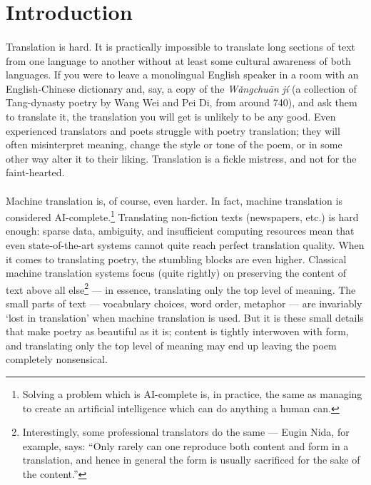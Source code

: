 \section*{Introduction}

\paragraph{}{Translation is hard. It is practically impossible to
  translate long sections of text from one language to another without
  at least some cultural awareness of both languages. If you were to
  leave a monolingual English speaker in a room with an
  English-Chinese dictionary and, say, a copy of the {\it W\v angchu\=
    an j\'i} (a collection of Tang-dynasty poetry by Wang Wei and Pei
  Di, from around 740), and ask them to translate it, the translation
  you will get is unlikely to be any good. Even experienced
  translators and poets struggle with poetry translation; they will
  often misinterpret meaning, change the style or tone of the poem, or
  in some other way alter it to their liking. \cite{wangwei}
  Translation is a fickle mistress, and not for the faint-hearted. }

\paragraph{}{Machine translation is, of course, even harder. In fact,
  machine translation is considered AI-complete.\footnote{Solving a
    problem which is AI-complete is, in practice, the same as managing
    to create an artificial intelligence which can do anything a human
    can.} Translating non-fiction texts (newspapers, etc.) is hard
  enough: sparse data, ambiguity, and insufficient computing resources
  mean that even state-of-the-art systems cannot quite reach perfect
  translation quality. When it comes to translating poetry, the
  stumbling blocks are even higher. Classical machine translation
  systems focus (quite rightly) on preserving the content of text
  above all else\footnote{Interestingly, some professional
    translators do the same --- Eugin Nida, for example, says: ``Only
    rarely can one reproduce both content and form in a translation,
    and hence in general the form is usually sacrificed for the sake
    of the content.''\cite{eugin}} --- in essence, translating only the
  top level of meaning. The small parts of text --- vocabulary
  choices, word order, metaphor --- are invariably `lost in
  translation' when machine translation is used. But it is these small
  details that make poetry as beautiful as it is; content is tightly
  interwoven with form, and translating only the top level of meaning
  may end up leaving the poem completely nonsensical.}

